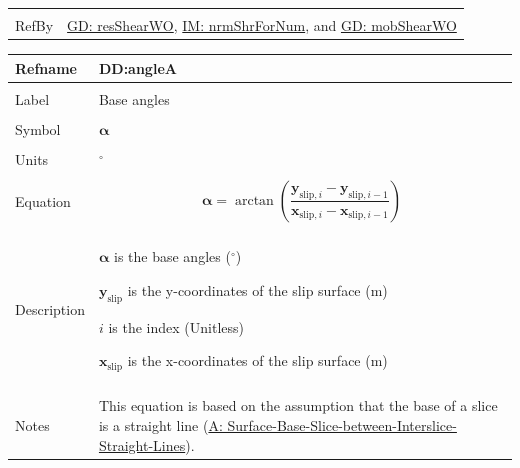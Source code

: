 \documentclass[12pt]{article}
\begin{document}
\begin{minipage}{\textwidth}
\begin{tabular}{>{\raggedright}p{}>{\raggedright\arraybackslash}p{}}
\\ \midrule \\
RefBy & \hyperref[GD:resShearWO]{GD: resShearWO}, \hyperref[IM:nrmShrForNum]{IM: nrmShrForNum}, and \hyperref[GD:mobShearWO]{GD: mobShearWO}
        
\\ \bottomrule
\end{tabular}
\end{minipage}

\vspace{\baselineskip}
\noindent
\begin{minipage}{\textwidth}
\begin{tabular}{>{\raggedright}p{}>{\raggedright\arraybackslash}p{}}
\toprule \textbf{Refname} & \textbf{DD:angleA}
\label{DD:angleA}
\\ \midrule \\
Label & Base angles
        
\\ \midrule \\
Symbol & $\mathbf{α}$
         
\\ \midrule \\
Units & ${}^{\circ}$
        
\\ \midrule \\
Equation & \begin{displaymath}
           \mathbf{α}=\arctan\left(\frac{{\mathbf{y}_{\text{slip},i}}-{\mathbf{y}_{\text{slip},i-1}}}{{\mathbf{x}_{\text{slip},i}}-{\mathbf{x}_{\text{slip},i-1}}}\right)
           \end{displaymath}
\\ \midrule \\
Description & \begin{symbDescription}
              \item{$\mathbf{α}$ is the base angles (${}^{\circ}$)}
              \item{${\mathbf{y}_{\text{slip}}}$ is the y-coordinates of the slip surface (m)}
              \item{$i$ is the index (Unitless)}
              \item{${\mathbf{x}_{\text{slip}}}$ is the x-coordinates of the slip surface (m)}
              \end{symbDescription}
\\ \midrule \\
Notes & This equation is based on the assumption that the base of a slice is a straight line (\hyperref[assumpSBSBISL]{A: Surface-Base-Slice-between-Interslice-Straight-Lines}).
        

\end{tabular}
\end{minipage}
\end{document}

